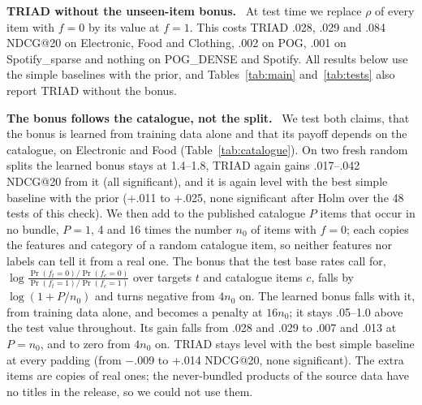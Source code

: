 \documentclass[runningheads]{llncs}
\renewcommand{\paragraph}[1]{\smallskip\noindent\textbf{#1}\ }
\begin{document}
\paragraph{TRIAD without the unseen-item bonus.} At test time we replace $\rho$ of every item with $f=0$ by its value
at $f=1$. This costs TRIAD .028, .029 and .084 NDCG@20 on Electronic, Food and Clothing, .002 on POG, .001 on
Spotify\_sparse and nothing on POG\_DENSE and Spotify. All results below use the simple baselines with the prior,
and Tables~\ref{tab:main} and~\ref{tab:tests} also report TRIAD without the bonus.

\paragraph{The bonus follows the catalogue, not the split.} We test both claims, that the bonus is learned
from training data alone and that its payoff depends on the catalogue, on Electronic and Food (Table~\ref{tab:catalogue}). On two fresh random splits the learned bonus stays at 1.4--1.8, TRIAD again gains
.017--.042 NDCG@20 from it (all significant), and it is again level with the best simple baseline with the prior
(+.011 to +.025, none significant after Holm over the 48 tests of this check). We then add to the published
catalogue $P$ items that occur in no bundle, $P=1$, 4 and 16 times the number $n_0$ of items with $f=0$; each copies
the features and category of a random catalogue item, so neither features nor labels can tell it from a real one. The bonus that the test base
rates call for, $\log\frac{\Pr(f_t=0)/\Pr(f_c=0)}{\Pr(f_t=1)/\Pr(f_c=1)}$ over targets $t$ and catalogue items $c$,
falls by $\log(1+P/n_0)$ and turns negative from $4n_0$ on. The learned bonus falls with it, from training data
alone, and becomes a penalty at $16n_0$; it stays .05--1.0 above the test value throughout. Its gain falls from .028
and .029 to .007 and .013 at $P=n_0$, and to zero from $4n_0$ on. TRIAD stays level with the best simple baseline at every padding
(from $-$.009 to +.014 NDCG@20, none significant). The extra items are copies of real ones; the never-bundled
products of the source data have no titles in the release, so we could not use them.
\end{document}
